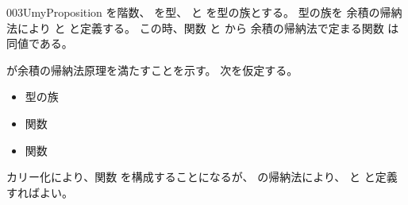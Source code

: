 \documentclass[index]{subfiles}
\begin{document}
\begin{myBlock}{003U}{myProposition}
  を階数、
  を型、
  と
  を型の族とする。
  型の族を
  余積の帰納法により
  と
  と定義する。
  この時、関数
  と
  から
  余積の帰納法で定まる関数
  は同値である。
\end{myBlock}
\begin{myProof}
  が余積の帰納法原理を満たすことを示す。
  次を仮定する。
  \begin{itemize}
  \item 型の族
  \item 関数
  \item 関数
  \end{itemize}
  カリー化により、関数
  を構成することになるが、
  の帰納法により、
  と
  と定義すればよい。
\end{myProof}
\end{document}
